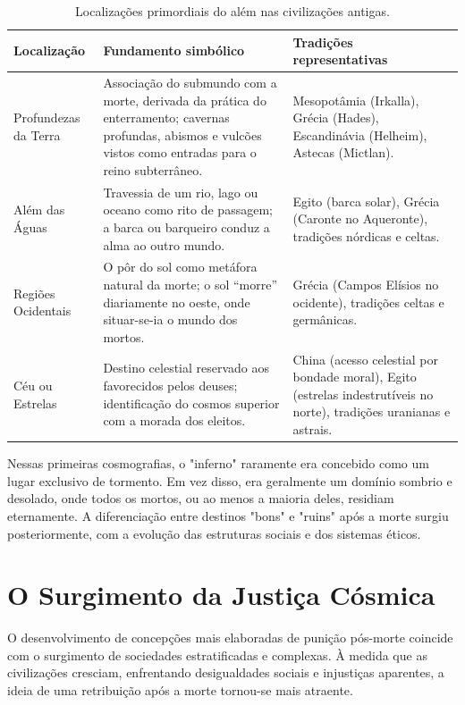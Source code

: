 \begin{table}[ht]
  \centering
  \small
  \renewcommand{\arraystretch}{1.3}
  \caption{Localizações primordiais do além nas civilizações antigas.}
  \begin{tabularx}{\textwidth}{|>{\raggedright\arraybackslash}p{3.2cm}|>{\raggedright\arraybackslash}p{3.8cm}|X|}
    \hline
    \textbf{Localização} & \textbf{Fundamento simbólico} & \textbf{Tradições representativas} \\
    \hline
    Profundezas da Terra & Associação do submundo com a morte, derivada da prática do enterramento; cavernas profundas, abismos e vulcões vistos como entradas para o reino subterrâneo. & Mesopotâmia (Irkalla), Grécia (Hades), Escandinávia (Helheim), Astecas (Mictlan). \\
    \hline
    Além das Águas & Travessia de um rio, lago ou oceano como rito de passagem; a barca ou barqueiro conduz a alma ao outro mundo. & Egito (barca solar), Grécia (Caronte no Aqueronte), tradições nórdicas e celtas. \\
    \hline
    Regiões Ocidentais & O pôr do sol como metáfora natural da morte; o sol ``morre'' diariamente no oeste, onde situar-se-ia o mundo dos mortos. & Grécia (Campos Elísios no ocidente), tradições celtas e germânicas. \\
    \hline
    Céu ou Estrelas & Destino celestial reservado aos favorecidos pelos deuses; identificação do cosmos superior com a morada dos eleitos. & China (acesso celestial por bondade moral), Egito (estrelas indestrutíveis no norte), tradições uranianas e astrais. \\
    \hline
  \end{tabularx}
\end{table}

Nessas primeiras cosmografias, o "inferno" raramente era concebido como um lugar exclusivo de tormento. Em vez disso, era geralmente um domínio sombrio e desolado, onde todos os mortos, ou ao menos a maioria deles, residiam eternamente. A diferenciação entre destinos "bons" e "ruins" após a morte surgiu posteriormente, com a evolução das estruturas sociais e dos sistemas éticos.

\section{O Surgimento da Justiça Cósmica}

O desenvolvimento de concepções mais elaboradas de punição pós-morte coincide com o surgimento de sociedades estratificadas e complexas. À medida que as civilizações cresciam, enfrentando desigualdades sociais e injustiças aparentes, a ideia de uma retribuição após a morte tornou-se mais atraente.

